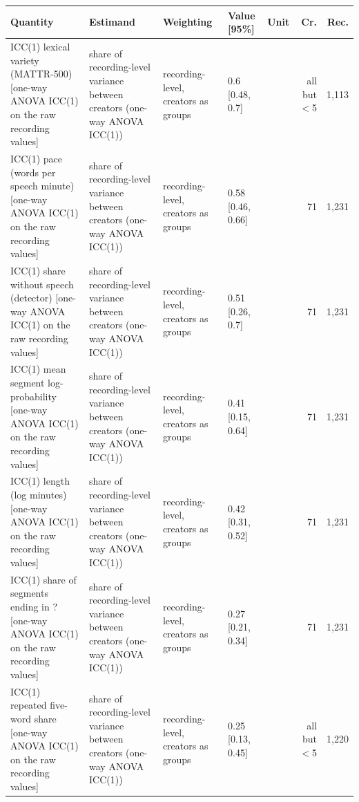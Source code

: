 {\scriptsize\setlength{\tabcolsep}{2pt}
\begin{tabular}{@{}p{}p{}p{}lp{}rr@{}}
\toprule
Quantity & Estimand & Weighting & Value [95\%] & Unit & Cr. & Rec. \\
\midrule
ICC(1) lexical variety (MATTR-500) [one-way ANOVA ICC(1) on the raw recording values] & share of recording-level variance between creators (one-way ANOVA ICC(1)) & recording-level, creators as groups & 0.6 [0.48, 0.7] &  & all but $<$5 & 1{,}113 \\
ICC(1) pace (words per speech minute) [one-way ANOVA ICC(1) on the raw recording values] & share of recording-level variance between creators (one-way ANOVA ICC(1)) & recording-level, creators as groups & 0.58 [0.46, 0.66] &  & 71 & 1{,}231 \\
ICC(1) share without speech (detector) [one-way ANOVA ICC(1) on the raw recording values] & share of recording-level variance between creators (one-way ANOVA ICC(1)) & recording-level, creators as groups & 0.51 [0.26, 0.7] &  & 71 & 1{,}231 \\
ICC(1) mean segment log-probability [one-way ANOVA ICC(1) on the raw recording values] & share of recording-level variance between creators (one-way ANOVA ICC(1)) & recording-level, creators as groups & 0.41 [0.15, 0.64] &  & 71 & 1{,}231 \\
ICC(1) length (log minutes) [one-way ANOVA ICC(1) on the raw recording values] & share of recording-level variance between creators (one-way ANOVA ICC(1)) & recording-level, creators as groups & 0.42 [0.31, 0.52] &  & 71 & 1{,}231 \\
ICC(1) share of segments ending in ? [one-way ANOVA ICC(1) on the raw recording values] & share of recording-level variance between creators (one-way ANOVA ICC(1)) & recording-level, creators as groups & 0.27 [0.21, 0.34] &  & 71 & 1{,}231 \\
ICC(1) repeated five-word share [one-way ANOVA ICC(1) on the raw recording values] & share of recording-level variance between creators (one-way ANOVA ICC(1)) & recording-level, creators as groups & 0.25 [0.13, 0.45] &  & all but $<$5 & 1{,}220 \\

\end{tabular}}
